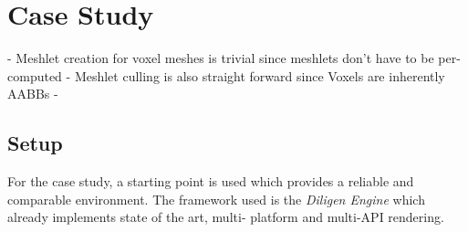 \chapter{Case Study} \label{cpt-case-study}


- Meshlet creation for voxel meshes is trivial since meshlets don't have to be per-computed
- Meshlet culling is also straight forward since Voxels are inherently AABBs
- 

\section{Setup}

For the case study, a starting point is used which provides a reliable and comparable environment.
The framework used is the \emph{Diligen Engine} which already implements state of the art, multi-
platform and multi-API rendering. \\

\noindent
